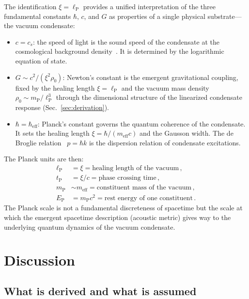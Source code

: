 \documentclass[12pt, a4paper]{article}
\newcommand{\meff}{m_{\mathrm{eff}}}
\newcommand{\heff}{\hbar_{\mathrm{eff}}}
\newcommand{\lP}{\ell_{\mathrm{P}}}
\newcommand{\mP}{m_{\mathrm{P}}}
\newcommand{\tP}{t_{\mathrm{P}}}
\begin{document}
The identification $\xi = \lP$ provides a unified
interpretation of the three fundamental constants
$\hbar$, $c$, and $G$ as properties of a single
physical substrate---the vacuum condensate:

\begin{itemize}
\item $c = c_s$: the speed of light is the sound speed
  of the condensate at the cosmological background
  density~\cite{kulangiev_2026a}. It is determined by
  the logarithmic equation of state.

\item $G \sim c^2/(\xi^2\rho_0)$: Newton's constant
  is the emergent gravitational coupling, fixed by
  the healing length $\xi = \lP$ and the vacuum mass
  density $\rho_0 \sim \mP/\lP^3$ through the
  dimensional structure of the linearized condensate
  response (Sec.~\ref{sec:derivation}).

\item $\hbar = \heff$: Planck's constant governs the
  quantum coherence of the condensate. It sets the
  healing length $\xi = \hbar/(\meff c)$ and the
  Gausson width. The de Broglie relation~\cite{de_broglie_1927}
  $p = \hbar k$ is the dispersion relation of
  condensate excitations.
\end{itemize}

The Planck units are then:
\begin{align}
    \lP &= \xi = \text{healing length of the vacuum}\,,
    \label{eq:lP}\\
    \tP &= \xi/c = \text{phase crossing time}\,,
    \label{eq:tP}\\
    \mP &\sim \meff = \text{constituent mass of the vacuum}\,,
    \label{eq:mP}\\
    E_{\mathrm{P}} &= \mP c^2 = \text{rest energy of one constituent}\,.
    \label{eq:EP}
\end{align}
The Planck scale is not a fundamental discreteness
of spacetime but the scale at which the emergent
spacetime description (acoustic metric) gives way
to the underlying quantum dynamics of the vacuum
condensate.


\section{Discussion}
\label{sec:discussion}

\subsection{What is derived and what is assumed}
\end{document}
